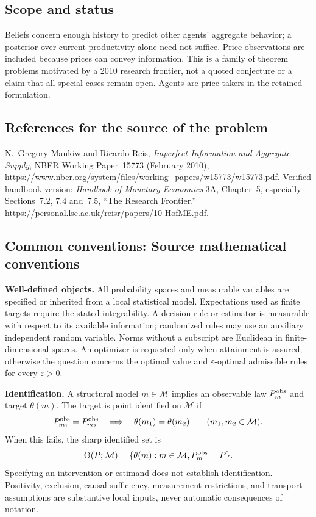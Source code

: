 \documentclass[11pt,a4paper]{article}
\begin{document}
\subsection*{Scope and status}
Beliefs concern enough history to predict other agents' aggregate behavior; a posterior over current productivity alone need not suffice. Price observations are included because prices can convey information. This is a family of theorem problems motivated by a 2010 research frontier, not a quoted conjecture or a claim that all special cases remain open. Agents are price takers in the retained formulation.
\subsection*{References for the source of the problem}
N.~Gregory Mankiw and Ricardo Reis, \emph{Imperfect Information and Aggregate Supply}, NBER Working Paper~15773 (February 2010), \url{https://www.nber.org/system/files/working_papers/w15773/w15773.pdf}. Verified handbook version: \emph{Handbook of Monetary Economics} 3A, Chapter~5, especially Sections~7.2, 7.4 and~7.5, ``The Research Frontier.'' \url{https://personal.lse.ac.uk/reisr/papers/10-HofME.pdf}.

\subsection*{Common conventions: Source mathematical conventions}

\textbf{Well-defined objects.}
All probability spaces and measurable variables are specified or inherited
from a local statistical model. Expectations used as finite targets require
the stated integrability. A decision rule or estimator is measurable with
respect to its available information; randomized rules may use an auxiliary
independent random variable. Norms without a subscript are Euclidean in
finite-dimensional spaces. An optimizer is requested only when attainment
is assured; otherwise the question concerns the optimal value and
$\varepsilon$-optimal admissible rules for every $\varepsilon>0$.

\textbf{Identification.}
A structural model $m\in\mathcal M$ implies an observable law
$P_m^{\rm obs}$ and target $\theta(m)$. The target is point identified on
$\mathcal M$ if
\[
 P_{m_1}^{\rm obs}=P_{m_2}^{\rm obs}
 \quad\Longrightarrow\quad\theta(m_1)=\theta(m_2)
 \qquad(m_1,m_2\in\mathcal M).
\]
When this fails, the sharp identified set is
\[
 \Theta(P;\mathcal M)=\{\theta(m):m\in\mathcal M,
                                  P_m^{\rm obs}=P\}.
\]
Specifying an intervention or estimand does not establish identification.
Positivity, exclusion, causal sufficiency, measurement restrictions, and
transport assumptions are substantive local inputs, never automatic
consequences of notation.
\end{document}
